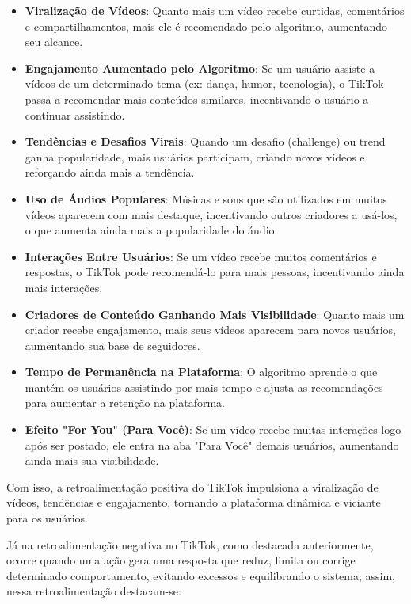 \begin{itemize}
 \item \textbf{Viralização de Vídeos}: Quanto mais um vídeo recebe curtidas, comentários e compartilhamentos, mais ele é recomendado pelo algoritmo, aumentando seu alcance.
\item \textbf{Engajamento Aumentado pelo Algoritmo}: Se um usuário assiste a vídeos de um determinado tema (ex: dança, humor, tecnologia), o TikTok passa a recomendar mais conteúdos similares, incentivando o usuário a continuar assistindo.
\item \textbf{Tendências e Desafios Virais}: Quando um desafio (challenge) ou trend ganha popularidade, mais usuários participam, criando novos vídeos e reforçando ainda mais a tendência.
\item \textbf{Uso de Áudios Populares}: Músicas e sons que são utilizados em muitos vídeos aparecem com mais destaque, incentivando outros criadores a usá-los, o que aumenta ainda mais a popularidade do áudio.
\item \textbf{Interações Entre Usuários}: Se um vídeo recebe muitos comentários e respostas, o TikTok pode recomendá-lo para mais pessoas, incentivando ainda mais interações.
\item \textbf{Criadores de Conteúdo Ganhando Mais Visibilidade}: Quanto mais um criador recebe engajamento, mais seus vídeos aparecem para novos usuários, aumentando sua base de seguidores.
\item \textbf{Tempo de Permanência na Plataforma}:
O algoritmo aprende o que mantém os usuários assistindo por mais tempo e ajusta as recomendações para aumentar a retenção na plataforma.
\item \textbf{Efeito "For You" (Para Você)}:
Se um vídeo recebe muitas interações logo após ser postado, ele entra na aba "Para Você" demais usuários, aumentando ainda mais sua visibilidade.
\end{itemize}


Com isso, a retroalimentação positiva do TikTok impulsiona a viralização de vídeos, tendências e engajamento, tornando a plataforma dinâmica e viciante para os usuários.\vskip0.3cm

Já na retroalimentação negativa no TikTok, como destacada anteriormente, ocorre quando uma ação gera uma resposta que reduz, limita ou corrige determinado comportamento, evitando excessos e equilibrando o sistema; assim, nessa retroalimentação destacam-se:

